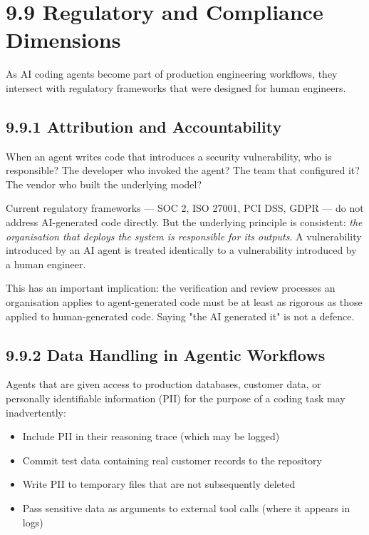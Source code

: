 \documentclass[11pt,a4paper]{book}
\begin{document}
\medskip

\section{9.9 Regulatory and Compliance Dimensions}

As AI coding agents become part of production engineering workflows, they intersect with regulatory frameworks that were designed for human engineers.

\subsection{9.9.1 Attribution and Accountability}

When an agent writes code that introduces a security vulnerability, who is responsible? The developer who invoked the agent? The team that configured it? The vendor who built the underlying model?

Current regulatory frameworks --- SOC 2, ISO 27001, PCI DSS, GDPR --- do not address AI-generated code directly. But the underlying principle is consistent: \textit{the organisation that deploys the system is responsible for its outputs}. A vulnerability introduced by an AI agent is treated identically to a vulnerability introduced by a human engineer.

This has an important implication: the verification and review processes an organisation applies to agent-generated code must be at least as rigorous as those applied to human-generated code. Saying "the AI generated it" is not a defence.

\subsection{9.9.2 Data Handling in Agentic Workflows}

Agents that are given access to production databases, customer data, or personally identifiable information (PII) for the purpose of a coding task may inadvertently:

\begin{itemize}
  \item Include PII in their reasoning trace (which may be logged)
  \item Commit test data containing real customer records to the repository
  \item Write PII to temporary files that are not subsequently deleted
  \item Pass sensitive data as arguments to external tool calls (where it appears in logs)
\end{itemize}
\end{document}
